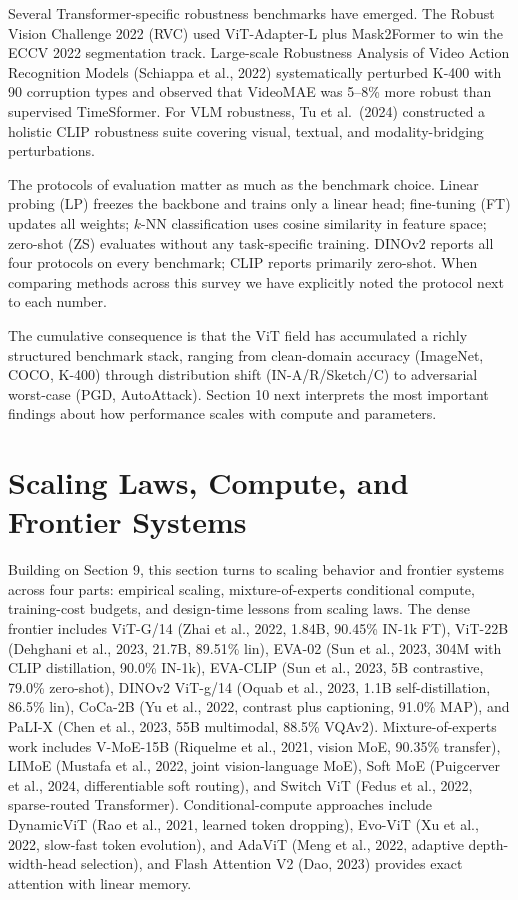 Several Transformer-specific robustness benchmarks have emerged. The Robust Vision Challenge 2022 (RVC) used ViT-Adapter-L plus Mask2Former to win the ECCV 2022 segmentation track. Large-scale Robustness Analysis of Video Action Recognition Models (Schiappa et al., 2022) systematically perturbed K-400 with 90 corruption types and observed that VideoMAE was 5--8\% more robust than supervised TimeSformer. For VLM robustness, Tu et al.~(2024) constructed a holistic CLIP robustness suite covering visual, textual, and modality-bridging perturbations.

The protocols of evaluation matter as much as the benchmark choice. Linear probing (LP) freezes the backbone and trains only a linear head; fine-tuning (FT) updates all weights; \(k\)-NN classification uses cosine similarity in feature space; zero-shot (ZS) evaluates without any task-specific training. DINOv2 reports all four protocols on every benchmark; CLIP reports primarily zero-shot. When comparing methods across this survey we have explicitly noted the protocol next to each number.

The cumulative consequence is that the ViT field has accumulated a richly structured benchmark stack, ranging from clean-domain accuracy (ImageNet, COCO, K-400) through distribution shift (IN-A/R/Sketch/C) to adversarial worst-case (PGD, AutoAttack). Section 10 next interprets the most important findings about how performance scales with compute and parameters.

\section{Scaling Laws, Compute, and Frontier Systems}\label{scaling-laws-compute-and-frontier-systems}

Building on Section 9, this section turns to scaling behavior and frontier systems across four parts: empirical scaling, mixture-of-experts conditional compute, training-cost budgets, and design-time lessons from scaling laws. The dense frontier includes ViT-G/14 (Zhai et al., 2022, 1.84B, 90.45\% IN-1k FT), ViT-22B (Dehghani et al., 2023, 21.7B, 89.51\% lin), EVA-02 (Sun et al., 2023, 304M with CLIP distillation, 90.0\% IN-1k), EVA-CLIP (Sun et al., 2023, 5B contrastive, 79.0\% zero-shot), DINOv2 ViT-g/14 (Oquab et al., 2023, 1.1B self-distillation, 86.5\% lin), CoCa-2B (Yu et al., 2022, contrast plus captioning, 91.0\% MAP), and PaLI-X (Chen et al., 2023, 55B multimodal, 88.5\% VQAv2). Mixture-of-experts work includes V-MoE-15B (Riquelme et al., 2021, vision MoE, 90.35\% transfer), LIMoE (Mustafa et al., 2022, joint vision-language MoE), Soft MoE (Puigcerver et al., 2024, differentiable soft routing), and Switch ViT (Fedus et al., 2022, sparse-routed Transformer). Conditional-compute approaches include DynamicViT (Rao et al., 2021, learned token dropping), Evo-ViT (Xu et al., 2022, slow-fast token evolution), and AdaViT (Meng et al., 2022, adaptive depth-width-head selection), and Flash Attention V2 (Dao, 2023) provides exact attention with linear memory.

